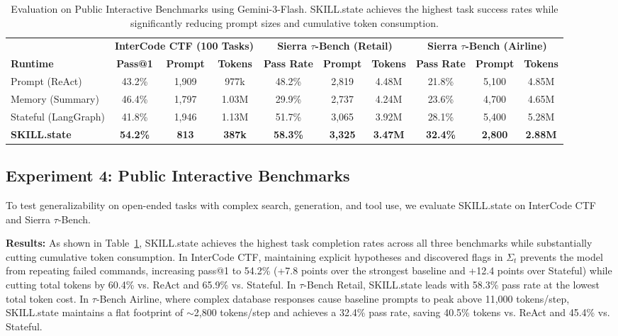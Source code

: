 \documentclass[11pt]{article}
\begin{document}
\begin{table}[t]
\centering
\small
\caption{Evaluation on Public Interactive Benchmarks using Gemini-3-Flash. SKILL.state achieves the highest task success rates while significantly reducing prompt sizes and cumulative token consumption.}
\label{tab:public_benchmarks}
\begin{tabular*}{\textwidth}{@{\extracolsep{\fill}}lccccccccc@{}}
\toprule
& \multicolumn{3}{c}{\textbf{InterCode CTF (100 Tasks)}} & \multicolumn{3}{c}{\textbf{Sierra $\tau$-Bench (Retail)}} & \multicolumn{3}{c}{\textbf{Sierra $\tau$-Bench (Airline)}} \\
\cmidrule(lr){2-4} \cmidrule(lr){5-7} \cmidrule(lr){8-10}
\textbf{Runtime} & \textbf{Pass@1} & \textbf{Prompt} & \textbf{Tokens} & \textbf{Pass Rate} & \textbf{Prompt} & \textbf{Tokens} & \textbf{Pass Rate} & \textbf{Prompt} & \textbf{Tokens} \\
\midrule
Prompt (ReAct) & 43.2\% & 1,909 & 977k & 48.2\% & 2,819 & 4.48M & 21.8\% & 5,100 & 4.85M \\
Memory (Summary) & 46.4\% & 1,797 & 1.03M & 29.9\% & 2,737 & 4.24M & 23.6\% & 4,700 & 4.65M \\
Stateful (LangGraph) & 41.8\% & 1,946 & 1.13M & 51.7\% & 3,065 & 3.92M & 28.1\% & 5,400 & 5.28M \\
\textbf{SKILL.state} & \textbf{54.2\%} & \textbf{813} & \textbf{387k} & \textbf{58.3\%} & \textbf{3,325} & \textbf{3.47M} & \textbf{32.4\%} & \textbf{2,800} & \textbf{2.88M} \\
\bottomrule
\end{tabular*}
\end{table}

\subsection{Experiment 4: Public Interactive Benchmarks}
\label{subsec:exp4_public_benchmarks}

To test generalizability on open-ended tasks with complex search, generation, and tool use, we evaluate SKILL.state on InterCode CTF and Sierra $\tau$-Bench.

\noindent\textbf{Results:} As shown in Table~\ref{tab:public_benchmarks}, SKILL.state achieves the highest task completion rates across all three benchmarks while substantially cutting cumulative token consumption. In InterCode CTF, maintaining explicit hypotheses and discovered flags in $\Sigma_t$ prevents the model from repeating failed commands, increasing pass@1 to 54.2\% (+7.8 points over the strongest baseline and +12.4 points over Stateful) while cutting total tokens by 60.4\% vs. ReAct and 65.9\% vs. Stateful. In $\tau$-Bench Retail, SKILL.state leads with 58.3\% pass rate at the lowest total token cost. In $\tau$-Bench Airline, where complex database responses cause baseline prompts to peak above 11,000 tokens/step, SKILL.state maintains a flat footprint of $\sim$2,800 tokens/step and achieves a 32.4\% pass rate, saving 40.5\% tokens vs. ReAct and 45.4\% vs. Stateful.
\end{document}
